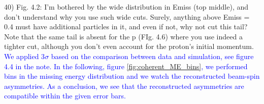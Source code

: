 40) Fig. 4.2: I'm bothered by the wide distribution in Emiss (top middle), and 
don't understand why you use such wide cuts. Surely, anything above Emiss = 0.4 
must have additional particles in it, and even if not, why not cut this tail?  
Note that the same tail is absent for the p (FIg. 4.6) where you use indeed a 
tighter cut, although you don't even account for the proton's initial 
momentum.\\
\textcolor{blue}{ We applied 3$\sigma$ based on the comparison between data 
and simulation, see figure 4.4 in the note. In the following, figure 
\ref{fig:coherent_ME_bins}, we performed bins in the missing energy 
distribution and we watch the reconstructed beam-spin asymmetries. As a 
conclusion, we see that the reconstructed asymmetries are compatible within the 
given error bars.} \\

